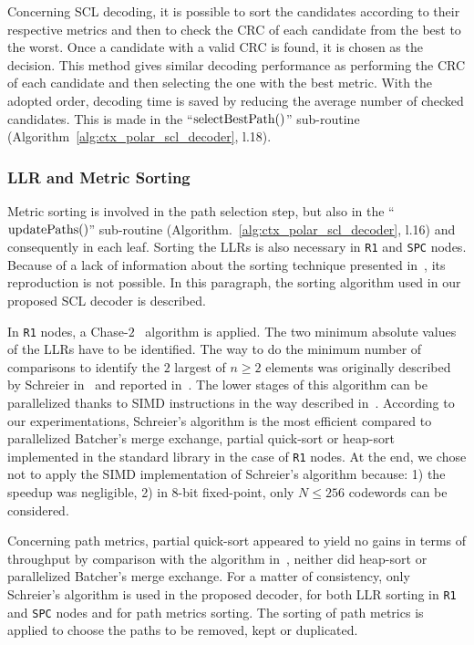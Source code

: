 Concerning SCL decoding, it is possible to sort the candidates according to
their respective metrics and then to check the CRC of each candidate from the
best to the worst. Once a candidate with a valid CRC is found, it is chosen as
the decision. This method gives similar decoding performance as performing the
CRC of each candidate and then selecting the one with the
best metric. With the adopted order, decoding time is saved by reducing the
average number of checked candidates. This is made in the
``$\operatorname*{selectBestPath}()$'' sub-routine (Algorithm~\ref{alg:ctx_polar_scl_decoder},
l.18).

\subsubsection{LLR and Metric Sorting}
\label{sec:opt_polar_scl_sorting}

Metric sorting is involved in the path selection step, but also
in the ``$\operatorname*{updatePaths}()$'' sub-routine
(Algorithm.~\ref{alg:ctx_polar_scl_decoder}, l.16) and consequently in each
leaf. Sorting the LLRs is also necessary in \verb|R1| and \verb|SPC| nodes.
Because of a lack of information about the sorting technique presented
in~\cite{Sarkis2016}, its reproduction is not possible. In this paragraph, the
sorting algorithm used in our proposed SCL decoder is described.

In \verb|R1| nodes, a Chase-$2$~\cite{Chase1972} algorithm is applied. The two
minimum absolute values of the LLRs have to be identified. The way to do the
minimum number of comparisons to identify the $2$ largest of $n\geq2$ elements
was originally described by Schreier in~\cite{Schreier1932} and reported
in~\cite{Knuth1973}. The lower stages of this algorithm can be parallelized
thanks to SIMD instructions in the way described in~\cite{Furtak2007}. According
to our experimentations, Schreier's algorithm is the most efficient compared to
parallelized Batcher's merge exchange, partial quick-sort or heap-sort
implemented in the \Cxx standard library in the case of \verb|R1| nodes. At the
end, we chose not to apply the SIMD implementation of Schreier's algorithm
because: 1) the speedup was negligible, 2) in 8-bit fixed-point, only
$N \leq 256$ codewords can be considered.

Concerning path metrics, partial quick-sort appeared to yield no gains in terms
of throughput by comparison with the algorithm in~\cite{Schreier1932}, neither
did heap-sort or parallelized Batcher's merge exchange. For a matter of
consistency, only Schreier's algorithm is used in the proposed decoder, for both
LLR sorting in \verb|R1| and \verb|SPC| nodes and for path metrics sorting. The
sorting of path metrics is applied to choose the paths to be removed, kept or
duplicated.

